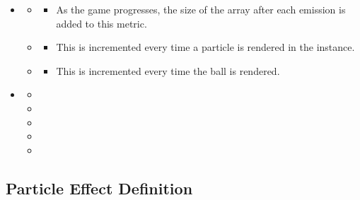 \begin{singlespace}

	\begin{itemize}[nolistsep,topsep=0pt]
	\itemsep1.0em

		\item {}
		\begin{itemize}[nolistsep,topsep=0pt]
			\item {}
				\begin{itemize}[nolistsep,topsep=0pt]
					\item As the game progresses, the size of the  array after each emission is added to this metric.
				\end{itemize}
			\item {}
				\begin{itemize}[nolistsep,topsep=0pt]
					\item This is incremented every time a particle is rendered in the  instance.
				\end{itemize}
			\item {}
				\begin{itemize}[nolistsep,topsep=0pt]
					\item This is incremented every time the ball is rendered.
				\end{itemize}
		\end{itemize}

		\item {}
		\begin{itemize}[nolistsep,topsep=0pt]
			\item {}
			\item {}
			\item {}
			\item {}
			\item {}
		\end{itemize}

	\end{itemize}

\end{singlespace}

\subsection{Particle Effect Definition}\label{ssec:instr_metrics_pe_definition}

